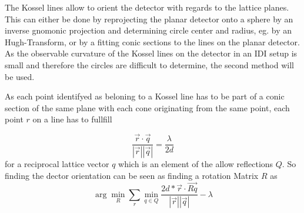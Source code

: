 The Kossel lines allow to orient the detector with regards to the lattice planes. This can either be done by reprojecting the planar detector onto a sphere by an inverse gnomonic projection and determining circle center and radius, eg. by an Hugh-Transform, or by a fitting conic sections to the lines on the planar detector. As the observable curvature of the Kossel lines on the detector in an IDI setup is small and therefore the circles are difficult to determine, the second method will be used. 

As each point identifyed as beloning to a Kossel line has to be part of a conic section of the same plane with each cone originating from the same point, each point $r$ on a line has to fullfill



\begin{equation}
\frac{\vec{r} \cdot \vec{q}}{\left|\vec{r}\right| \left| \vec{q}\right|} = \frac{\lambda}{2d}
\end{equation}
 for a reciprocal lattice vector $q$ which is an element of the allow reflections $Q$. So finding the dector orientation can be seen as finding a rotation Matrix $R$ as
\begin{equation}
\arg\!\min_{R} \sum_{r} \min_{q\in Q} \frac{2 d * \vec{r} \cdot \vec{Rq}}{\left|\vec{r}\right| \left| \vec{q}\right|} -\lambda
\end{equation}
